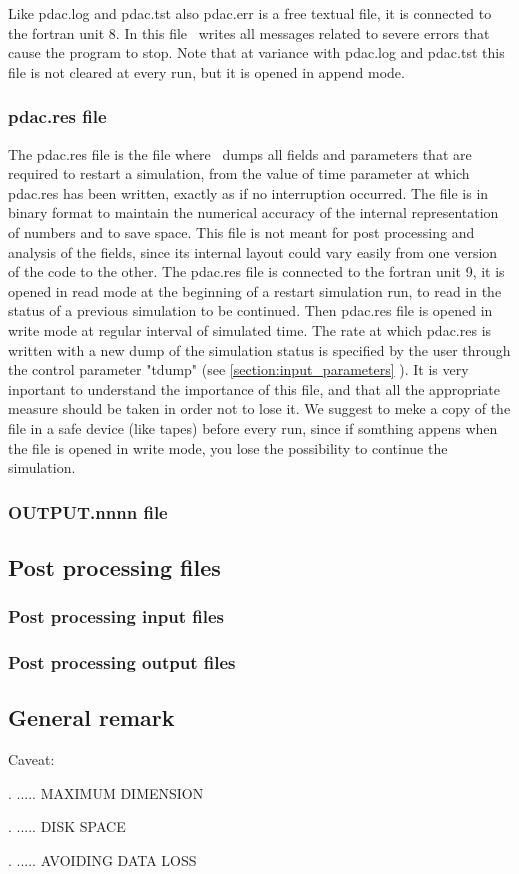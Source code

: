 Like pdac.log and pdac.tst also pdac.err is a free textual file,
it is connected to the fortran unit 8. In this file \PDAC\ writes
all messages related to severe errors that cause the program to stop.
Note that at variance with pdac.log and pdac.tst this file is not 
cleared at every run, but it is opened in append mode.

\subsubsection{pdac.res file}
\label{section:padc_res}

The pdac.res file is the file where \PDAC\ dumps all fields and
parameters that are required to restart a simulation, from the 
value of time parameter at which pdac.res has been written, exactly as
if no interruption occurred. The file is in binary format to maintain
the numerical accuracy of the internal representation of numbers
and to save space. This file is not meant for post processing
and analysis of the fields, since its internal layout could
vary easily from one version of the code to the other.
The pdac.res file is connected to the fortran unit 9, it is
opened in read mode at the beginning of a restart simulation run,
to read in the status of a previous simulation to be continued.
Then pdac.res file is opened in write mode at regular interval
of simulated time. The rate at which pdac.res is written
with a new dump of the simulation status is specified by
the user through the control parameter "tdump" (see \ref{section:input_parameters} ).
It is very inportant to understand the importance of this file,
and that all the appropriate measure should be taken in order
not to lose it. We suggest to meke a copy of the file in 
a safe device (like tapes) before every run, since if somthing appens
when the file is opened in write mode, you lose the possibility
to continue the simulation.


\subsubsection{OUTPUT.nnnn file}

\subsection{Post processing files}
\label{section:file_postprocessing}

\subsubsection{Post processing input files}

\subsubsection{Post processing output files}

\subsection{General remark}

\noindent Caveat:

. ..... MAXIMUM DIMENSION

. ..... DISK SPACE

. ..... AVOIDING DATA LOSS
